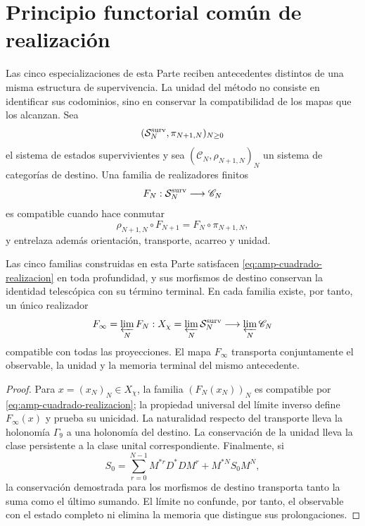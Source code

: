 \section*{Principio functorial común de realización}
\label{sec:amp-principio-realizacion}

Las cinco especializaciones de esta Parte reciben antecedentes distintos de
una misma estructura de supervivencia. La unidad del método no consiste en
identificar sus codominios, sino en conservar la compatibilidad de los mapas
que los alcanzan. Sea
\[
 (\mathcal S_N^{\rm surv},\pi_{N+1,N})_{N\geq0}
\]
el sistema de estados supervivientes y sea
\((\mathscr C_N,\rho_{N+1,N})_N\) un sistema de categorías de destino.
Una familia de realizadores finitos
\begin{equation}\label{eq:amp-realizadores-finitos}
 F_N:\mathcal S_N^{\rm surv}\longrightarrow\mathscr C_N
\end{equation}
es compatible cuando hace conmutar
\begin{equation}\label{eq:amp-cuadrado-realizacion}
 \rho_{N+1,N}\circ F_{N+1}
 =F_N\circ\pi_{N+1,N},
\end{equation}
y entrelaza además orientación, transporte, acarreo y unidad.

\begin{theorem}
\label{thm:amp-principio-realizacion}
Las cinco familias construidas en esta Parte satisfacen
\eqref{eq:amp-cuadrado-realizacion} en toda profundidad, y sus morfismos de
destino conservan la identidad telescópica con su término terminal. En cada
familia existe, por tanto, un único realizador
\begin{equation}\label{eq:amp-realizador-limite}
 F_\infty=\varprojlim_NF_N:
 X_\chi=\varprojlim_N\mathcal S_N^{\rm surv}
 \longrightarrow\varprojlim_N\mathscr C_N
\end{equation}
compatible con todas las proyecciones. El mapa \(F_\infty\) transporta
conjuntamente el observable, la unidad y la memoria terminal del mismo
antecedente.
\end{theorem}

\begin{proof}
Para \(x=(x_N)_N\in X_\chi\), la familia
\((F_N(x_N))_N\) es compatible por
\eqref{eq:amp-cuadrado-realizacion}; la propiedad universal del límite
inverso define \(F_\infty(x)\) y prueba su unicidad. La naturalidad respecto
del transporte lleva la holonomía \(\Gamma_9\) a una holonomía del destino.
La conservación de la unidad lleva la clase persistente a la clase unital
correspondiente. Finalmente, si
\[
 S_0=\sum_{r=0}^{N-1}M^{*r}D^*DM^r+M^{*N}S_0M^N,
\]
la conservación demostrada para los morfismos de destino transporta tanto la suma como
el último sumando. El límite no confunde, por tanto, el observable con el
estado completo ni elimina la memoria que distingue sus prolongaciones.
\end{proof}

